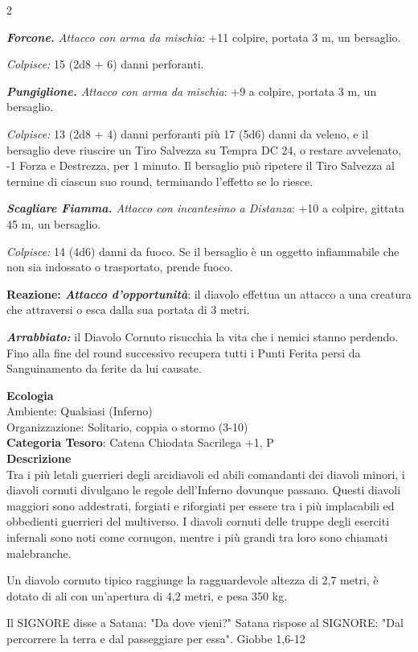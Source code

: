 \begin{multicols}{2}
{\emph{\textbf{Forcone.} Attacco con arma da mischia}: +11 colpire, portata 3 m, un bersaglio.

\emph{Colpisce:} 15 (2d8 + 6) danni perforanti.

\emph{\textbf{Pungiglione.} Attacco con arma da mischia}: +9 a colpire, portata 3 m, un bersaglio.

\emph{Colpisce:} 13 (2d8 + 4) danni perforanti più 17 (5d6) danni da veleno, e il bersaglio deve riuscire un Tiro Salvezza su Tempra DC 24, o restare avvelenato, -1 Forza e Destrezza, per 1 minuto. Il bersaglio può ripetere il Tiro Salvezza al termine di ciascun suo round, terminando l'effetto se lo riesce.

\emph{\textbf{Scagliare Fiamma.} Attacco con incantesimo a Distanza}: +10 a colpire, gittata 45 m, un bersaglio.

\emph{Colpisce:} 14 (4d6) danni da fuoco. Se il bersaglio è un oggetto infiammabile che non sia indossato o trasportato, prende fuoco.

\textbf{Reazione: \emph{Attacco d'opportunità}}: il diavolo effettua un attacco a una creatura che attraversi o esca dalla sua portata di 3 metri.

\emph{\textbf{Arrabbiato:}} il Diavolo Cornuto risucchia la vita che i nemici stanno perdendo. Fino alla fine del round successivo recupera tutti i Punti Ferita persi da Sanguinamento da ferite da lui causate.

\textbf{Ecologia}\\
Ambiente: Qualsiasi (Inferno)\\
Organizzazione: Solitario, coppia o stormo (3-10)\\
\textbf{Categoria Tesoro}: Catena Chiodata Sacrilega +1, P\\
\textbf{Descrizione}\\
Tra i più letali guerrieri degli arcidiavoli ed abili comandanti dei diavoli minori, i diavoli cornuti divulgano le regole dell'Inferno dovunque passano. Questi diavoli maggiori sono addestrati, forgiati e riforgiati per essere tra i più implacabili ed obbedienti guerrieri del multiverso. I diavoli cornuti delle truppe degli eserciti infernali sono noti come cornugon, mentre i più grandi tra loro sono chiamati malebranche.

Un diavolo cornuto tipico raggiunge la ragguardevole altezza di 2,7 metri, è dotato di ali con un'apertura di 4,2 metri, e pesa 350 kg.

\medskip

\begin{enfasi}{Il SIGNORE disse a Satana: "Da dove vieni?" Satana rispose al SIGNORE: "Dal percorrere la terra e dal passeggiare per essa". Giobbe 1,6-12}\end{enfasi}

}
\end{multicols}

